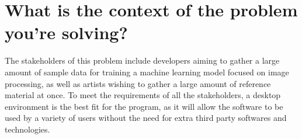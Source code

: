 \documentclass{article}
\begin{document}
\section* {What is the context of the problem you’re solving?}

The stakeholders of this problem include developers aiming to gather a large amount of sample data for training a machine learning model focused on image processing, as well as artists wishing to gather a large amount of reference material at once. To meet the requirements of all the stakeholders, a desktop environment is the best fit for the program, as it will allow the software to be used by a variety of users without the need for extra third party softwares and technologies.
\end{document}
